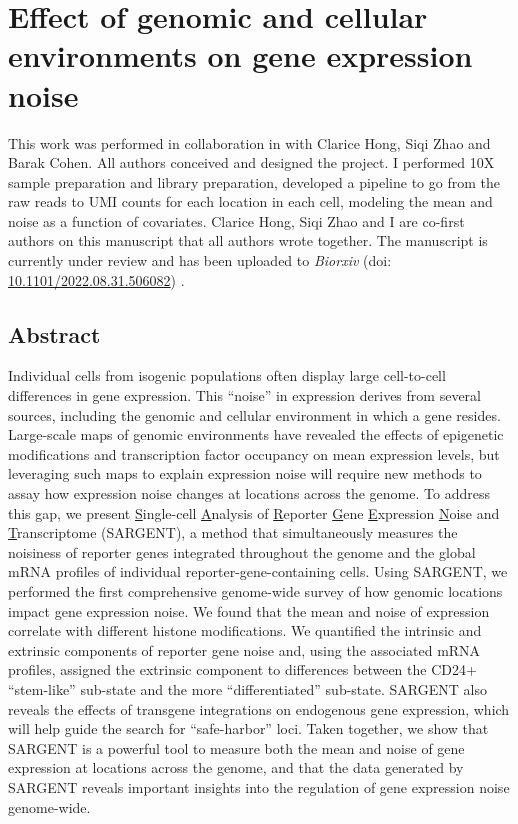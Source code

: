 \chapter{Effect of genomic and cellular environments on gene expression noise}
\label{chap:cas}

This work was performed in collaboration in with Clarice Hong, Siqi Zhao and Barak Cohen. All authors conceived and designed the project. I performed 10X sample preparation and library preparation, developed a pipeline to go from the raw reads to UMI counts for each location in each cell, modeling the mean and noise as a function of covariates. Clarice Hong, Siqi Zhao and I are co-first authors on this manuscript that all authors wrote together. The manuscript is currently under review and has been uploaded to \textit{Biorxiv} (doi: \href{https://www.biorxiv.org/content/10.1101/2022.08.31.506082v1}{10.1101/2022.08.31.506082}) \cite{hongcky_cohenba:EffectGenomic2022}.

\section{Abstract}

Individual cells from isogenic populations often display large cell-to-cell differences in gene expression. This \enquote{noise} in expression derives from several sources, including the genomic and cellular environment in which a gene resides. Large-scale maps of genomic environments have revealed the effects of epigenetic modifications and transcription factor occupancy on mean expression levels, but leveraging such maps to explain expression noise will require new methods to assay how expression noise changes at locations across the genome. To address this gap, we present \underline{S}ingle-cell \underline{A}nalysis of \underline{R}eporter \underline{G}ene \underline{E}xpression \underline{N}oise and \underline{T}ranscriptome (SARGENT), a method that simultaneously measures the noisiness of reporter genes integrated throughout the genome and the global mRNA profiles of individual reporter-gene-containing cells. Using SARGENT, we performed the first comprehensive genome-wide survey of how genomic locations impact gene expression noise. We found that the mean and noise of expression correlate with different histone modifications. We quantified the intrinsic and extrinsic components of reporter gene noise and, using the associated mRNA profiles, assigned the extrinsic component to differences between the CD24+ \enquote{stem-like} sub-state and the more \enquote{differentiated} sub-state. SARGENT also reveals the effects of transgene integrations on endogenous gene expression, which will help guide the search for \enquote{safe-harbor} loci. Taken together, we show that SARGENT is a powerful tool to measure both the mean and noise of gene expression at locations across the genome, and that the data generated by SARGENT reveals important insights into the regulation of gene expression noise genome-wide. 

